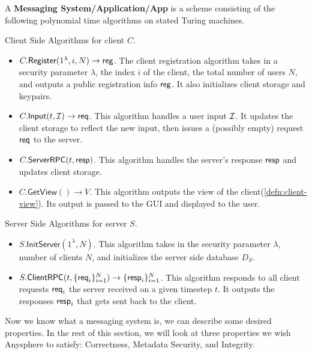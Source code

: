 \begin{definition}
\label{defn:messaging-scheme}
A \textbf{Messaging System/Application/App} is a scheme consisting of the following polynomial time algorithms on stated Turing machines.

Client Side Algorithms for client $C$.
\begin{itemize}
    \item $C.\mathsf{Register}(1^{\lambda}, i, N) \to \mathsf{reg}$. The client registration algorithm takes in a security parameter $\lambda$, the index $i$ of the client, the total number of users $N$, and outputs a public registration info $\mathsf{reg}$. It also initializes client storage and keypairs.
    
    \item $C.\mathsf{Input}(t, \mathcal{I}) \to \mathsf{req}$. This algorithm handles a user input $\mathcal{I}$. It updates the client storage to reflect the new input, then issues a (possibly empty) request $\mathsf{req}$ to the server.
    
    \item $C.\mathsf{ServerRPC}(t, \mathsf{resp})$. This algorithm handles the server's response $\mathsf{resp}$ and updates client storage.
    
    \item $C.\mathsf{GetView}() \to V$. This algorithm outputs the view of the client(\cref{defn:client-view}). Its output is passed to the GUI and displayed to the user.
\end{itemize}

Server Side Algorithms for server $S$.

\begin{itemize}
    \item $S.\mathsf{InitServer}(1^{\lambda}, N)$. This algorithm takes in the security parameter $\lambda$, number of clients $N$, and initializes the server side database $D_S$.
    \item $S.\mathsf{ClientRPC}(t, \{\mathsf{req}_i\}_{i = 1}^N) \to \{\mathsf{resp}_i\}_{i = 1}^N$. This algorithm responds to all client requests $\mathsf{req}_i$ the server received on a given timestep $t$. It outputs the responses $\mathsf{resp}_i$ that gets sent back to the client.
\end{itemize}
\end{definition}


Now we know what a messaging system is, we can describe some desired properties. In the rest of this section, we will look at three properties we wish Anysphere to satisfy: Correctness, Metadata Security, and Integrity.

